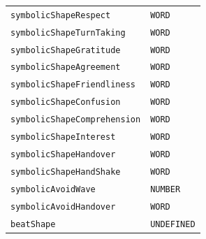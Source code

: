 \documentclass{CSSRforAfrica}
\begin{document}
\begin{table}[H]
\begin{tabular}{l l}
{\footnotesize \verb+symbolicShapeRespect+}                                 & {\footnotesize \verb+WORD+ } \vspace{-1.5mm}\\
{\footnotesize \verb+symbolicShapeTurnTaking+}                          & {\footnotesize \verb+WORD+ } \vspace{-1.5mm}\\
{\footnotesize \verb+symbolicShapeGratitude+} 	                          & {\footnotesize \verb+WORD+} \vspace{-1.5mm}\\
{\footnotesize \verb+symbolicShapeAgreement+}                           & {\footnotesize \verb+WORD+} \vspace{-1.5mm}\\
{\footnotesize \verb+symbolicShapeFriendliness+}                          & {\footnotesize \verb+WORD+ } \vspace{-1.5mm}\\
{\footnotesize \verb+symbolicShapeConfusion+} 	                          & {\footnotesize \verb+WORD+ } \vspace{-1.5mm}\\
{\footnotesize \verb+symbolicShapeComprehension+} 	                  & {\footnotesize \verb+WORD+ } \vspace{-1.5mm}\\
{\footnotesize \verb+symbolicShapeInterest+} 	                          & {\footnotesize \verb+WORD+ } \vspace{-1.5mm}\\
{\footnotesize \verb+symbolicShapeHandover+} 	                          & {\footnotesize \verb+WORD+} \vspace{-1.5mm}\\
{\footnotesize \verb+symbolicShapeHandShake+} 	                  & {\footnotesize \verb+WORD+} \vspace{-1.5mm}\\
{\footnotesize \verb+symbolicAvoidWave+} 	                                  & {\footnotesize \verb+NUMBER+  } \vspace{-1.5mm}\\
{\footnotesize \verb+symbolicAvoidHandover+} 	                          & {\footnotesize \verb+WORD+} \vspace{-1.5mm}\\
{\footnotesize \verb+beatShape+}  	                                          & {\footnotesize \verb+UNDEFINED+}\vspace{-1.5mm}   \\

\end{tabular}
\end{table}
\end{document}
